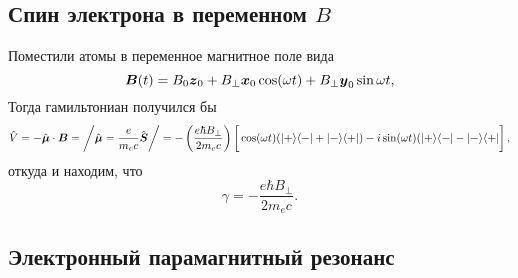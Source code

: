 \setcounter{section}{1}

\subsection{Спин электрона в переменном \texorpdfstring{$B$}{B}}

Поместили атомы в переменное магнитное поле вида
\begin{equation*}
    \mbox{\boldmath $B$}(t) = B_0 \mbox{\boldmath $z$}_0 + B_\bot \mbox{\boldmath $x$}_0 \cos (\omega t) + B_\bot \mbox{\boldmath $y$}_0 \sin \omega t,
\end{equation*}
Тогда гамильтониан получился бы
\begin{equation*}
    \hat{V} = - \hat{\vc{\mu}} \cdot \vc{B} = \bigg/
    \hat{\vc{\mu}} = \frac{e}{m_e c} \hat{\vc{S}} \bigg/
    = -  \left(\frac{e \hbar B_\bot}{2 m_e c}\right) \left[ \vp
        \cos (\omega t) (\kb{+}{-}  + \kb{-}{+})
        - i \sin (\omega t) (\kb{+}{-} - \kb{-}{+}
    \right],
\end{equation*}
откуда и находим, что
\begin{equation*}
    \gamma = - \frac{e \hbar B_\bot}{2 m_e c}.
\end{equation*}







\subsection{Электронный парамагнитный резонанс}


